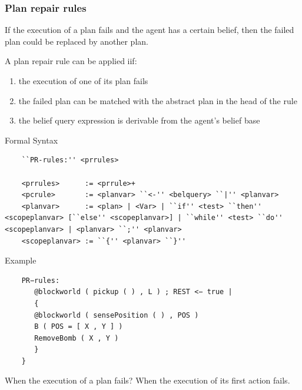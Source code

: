 \documentclass[dvipsnames,usenames,10pt]{beamer}
\newcommand{\bsyntax}{\begin{beamerboxesrounded}[upper=synupcol,lower=synlowcol,shadow=true]{Formal Syntax}}
\newcommand{\esyntax}{\end{beamerboxesrounded}}
\newcommand{\bexample}{\begin{beamerboxesrounded}[upper=exupcol,lower=exlowcol,shadow=true]{Example}}
\newcommand{\eexample}{\end{beamerboxesrounded}}
\begin{document}
\begin{frame}
	\frametitle{Plan repair rules}

	If the execution of a plan fails and the agent has a certain belief, then the failed plan could be replaced by another plan.

	A plan repair rule can be applied iif:
	\begin{enumerate}
		\item the execution of one of its plan fails
		\item the failed plan can be matched with the abstract plan in the head of the rule
		\item the belief query expression is derivable from the agent’s belief base
	\end{enumerate}

	\break

	\bsyntax
	\small
	\begin{verbatim}
	``PR-rules:'' <prrules>

	<prrules>      := <prrule>+
	<pcrule>       := <planvar> ``<-'' <belquery> ``|'' <planvar>
	<planvar>      := <plan> | <Var> | ``if'' <test> ``then'' <scopeplanvar> [``else'' <scopeplanvar>] | ``while'' <test> ``do'' <scopeplanvar> | <planvar> ``;'' <planvar>
	<scopeplanvar> := ``{'' <planvar> ``}''
	\end{verbatim}
	\esyntax

	\break
	
	\bexample
	\begin{verbatim}
	PR−rules: 
	   @blockworld ( pickup ( ) , L ) ; REST <− true | 
	   { 
	   @blockworld ( sensePosition ( ) , POS )
	   B ( POS = [ X , Y ] )
	   RemoveBomb ( X , Y )
	   }
	}
	\end{verbatim}
	\eexample

	\break

	When the execution of a plan fails?  When the execution of its first action fails.


\end{frame}
\end{document}
